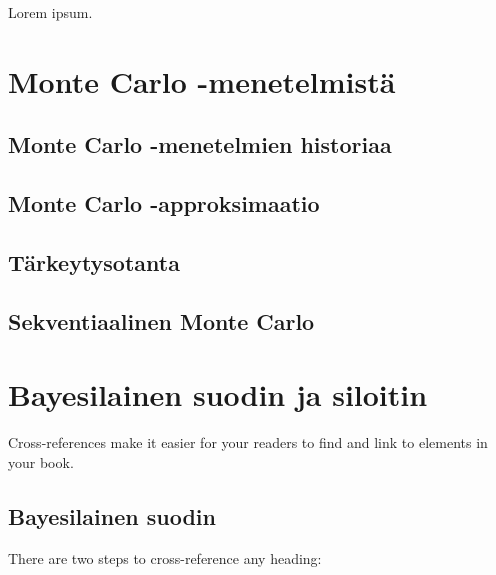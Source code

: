 \documentclass[
  12pt,
  a4paper, twoside]{book}
\theoremstyle{definition}
\theoremstyle{definition}
\theoremstyle{definition}
\theoremstyle{definition}
\theoremstyle{remark}
\begin{document}
Lorem ipsum.

\hypertarget{monte-carlo--menetelmistuxe4}{%
\chapter{Monte Carlo -menetelmistä}\label{monte-carlo--menetelmistuxe4}}

\hypertarget{monte-carlo--menetelmien-historiaa}{%
\section{Monte Carlo -menetelmien historiaa}\label{monte-carlo--menetelmien-historiaa}}

\hypertarget{monte-carlo--approksimaatio}{%
\section{Monte Carlo -approksimaatio}\label{monte-carlo--approksimaatio}}

\hypertarget{tuxe4rkeytysotanta}{%
\section{Tärkeytysotanta}\label{tuxe4rkeytysotanta}}

\hypertarget{sekventiaalinen-monte-carlo}{%
\section{Sekventiaalinen Monte Carlo}\label{sekventiaalinen-monte-carlo}}

\hypertarget{bayesilainen-suodin-ja-siloitin}{%
\chapter{Bayesilainen suodin ja siloitin}\label{bayesilainen-suodin-ja-siloitin}}

Cross-references make it easier for your readers to find and link to elements in your book.

\hypertarget{bayesilainen-suodin}{%
\section{Bayesilainen suodin}\label{bayesilainen-suodin}}

There are two steps to cross-reference any heading:
\end{document}
